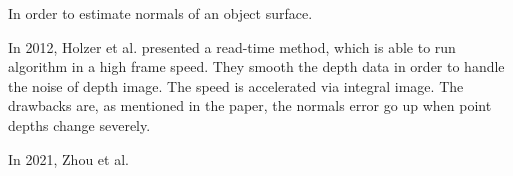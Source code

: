 

In order to estimate normals of an object surface.

In 2012, Holzer et al. \cite{Holzer.S} presented a read-time method, which is able to run algorithm in a high frame speed. They smooth the depth data in order to handle the noise of depth image. The speed is accelerated via integral image. The drawbacks are, as mentioned in the paper, the normals error go up when point depths change severely.

In 2021, Zhou et al.  \cite{zhou2021fast}



